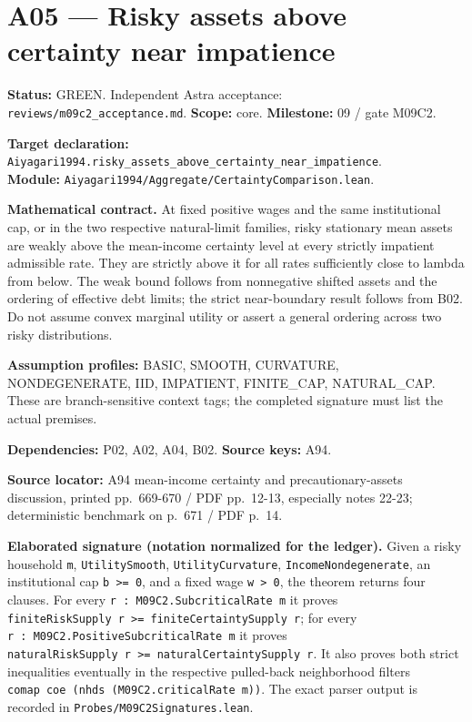 \documentclass[
  11pt,
]{article}
\let\LedgerOriginalTexttt\texttt
\renewcommand{\texttt}[1]{{\small\LedgerOriginalTexttt{#1}}}
\begin{document}
\section{A05 --- Risky assets above certainty near
impatience}\label{a05-risky-assets-above-certainty-near-impatience}

\textbf{Status:} GREEN. Independent Astra acceptance:
\texttt{reviews/m09c2\_acceptance.md}. \textbf{Scope:} core.
\textbf{Milestone:} 09 / gate M09C2.

\textbf{Target declaration:}
\texttt{Aiyagari1994.risky\_assets\_above\_certainty\_near\_impatience}.\\
\textbf{Module:}
\texttt{Aiyagari1994/Aggregate/CertaintyComparison.lean}.

\textbf{Mathematical contract.} At fixed positive wages and the same
institutional cap, or in the two respective natural-limit families,
risky stationary mean assets are weakly above the mean-income certainty
level at every strictly impatient admissible rate. They are strictly
above it for all rates sufficiently close to lambda from below. The weak
bound follows from nonnegative shifted assets and the ordering of
effective debt limits; the strict near-boundary result follows from B02.
Do not assume convex marginal utility or assert a general ordering
across two risky distributions.

\textbf{Assumption profiles:} BASIC, SMOOTH, CURVATURE, NONDEGENERATE,
IID, IMPATIENT, FINITE\_CAP, NATURAL\_CAP. These are branch-sensitive
context tags; the completed signature must list the actual premises.

\textbf{Dependencies:} P02, A02, A04, B02. \textbf{Source keys:} A94.

\textbf{Source locator:} A94 mean-income certainty and
precautionary-assets discussion, printed pp.~669-670 / PDF pp.~12-13,
especially notes 22-23; deterministic benchmark on p.~671 / PDF p.~14.

\textbf{Elaborated signature (notation normalized for the ledger).}
Given a risky household \texttt{m}, \texttt{UtilitySmooth},
\texttt{UtilityCurvature}, \texttt{IncomeNondegenerate}, an
institutional cap \texttt{b\ \textgreater{}=\ 0}, and a fixed wage
\texttt{w\ \textgreater{}\ 0}, the theorem returns four clauses. For
every \texttt{r\ :\ M09C2.SubcriticalRate\ m} it proves
\texttt{finiteRiskSupply\ r\ \textgreater{}=\ finiteCertaintySupply\ r};
for every \texttt{r\ :\ M09C2.PositiveSubcriticalRate\ m} it proves
\texttt{naturalRiskSupply\ r\ \textgreater{}=\ naturalCertaintySupply\ r}.
It also proves both strict inequalities eventually in the respective
pulled-back neighborhood filters
\texttt{comap\ coe\ (nhds\ (M09C2.criticalRate\ m))}. The exact parser
output is recorded in \texttt{Probes/M09C2Signatures.lean}.
\end{document}
